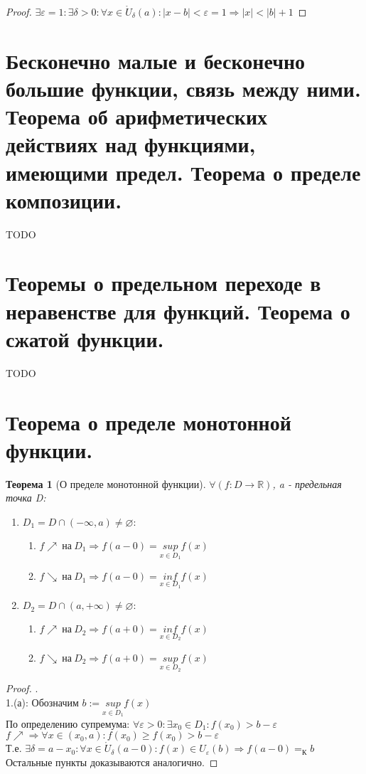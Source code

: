 \documentclass[12pt, a4]{article}
\newtheorem*{theorem}{Теорема}
\renewcommand{\sup}[1]{\underset{#1}{sup}}
\renewcommand{\inf}[1]{\underset{#1}{inf}}
\renewcommand{\implies}{\Rightarrow}
\renewcommand{\emptyset}{\varnothing}
\renewcommand{\epsilon}{\varepsilon}
\newcommand{\R}{\mathbb{R}}
\renewcommand{\U}{\mathring{U}}
\begin{document}
\begin{proof}
$\exists \epsilon = 1: \exists \delta > 0: \forall x \in \U_\delta(a): |x-b| < \epsilon = 1 \implies |x| < |b| + 1$
\end{proof}

\section{Бесконечно малые и бесконечно большие функции, связь между ними. Теорема об арифметических действиях над функциями, имеющими предел. Теорема о пределе композиции.} TODO

\section{Теоремы о предельном переходе в неравенстве для функций. Теорема о сжатой функции.} TODO

\section{Теорема о пределе монотонной функции.}

\begin{theorem}[О пределе монотонной функции]
$\forall (f: D \to \R)$, a - предельная точка D:\\
\begin{enumerate}
    \item $D_1 = D \cap (-\infty, a) \neq \emptyset:$\\
    \begin{enumerate}
        \item $f\nearrow\ на\ D_1 \implies f(a-0)=\sup{x\in D_1}f(x)$
        \item $f\searrow\ на\ D_1 \implies f(a-0)=\inf{x\in D_1}f(x)$
    \end{enumerate}
    \item $D_2 = D \cap (a, +\infty) \neq \emptyset:$\\
    \begin{enumerate}
        \item $f\nearrow\ на\ D_2 \implies f(a+0)=\inf{x\in D_2}f(x)$
        \item $f\searrow\ на\ D_2 \implies f(a+0)=\sup{x\in D_2}f(x)$
    \end{enumerate}
\end{enumerate}
\end{theorem}

\begin{proof}.\\
1.(а): Обозначим $b := \sup{x\in D_1}f(x)$\\
По определению супремума: $\forall \epsilon > 0: \exists x_0\in D_1: f(x_0) > b - \epsilon$\\
$f\nearrow \implies \forall x \in (x_0, a): f(x_0) \geq f(x_0) > b - \epsilon$\\
Т.е. $\exists \delta = a - x_0: \forall x \in \U_\delta(a-0): f(x) \in U_\epsilon(b) \implies f(a-0) =_К b$\\
Остальные пункты доказываются аналогично.
\end{proof}
\end{document}
